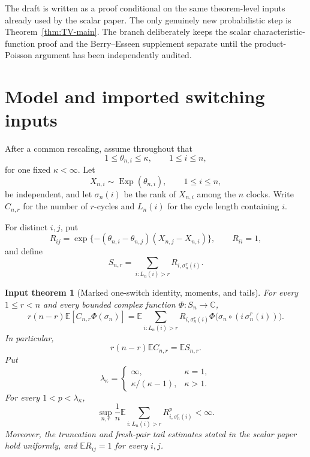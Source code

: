 \documentclass[11pt]{article}
\newtheorem{inputtheorem}[theorem]{Input theorem}
\theoremstyle{definition}
\theoremstyle{remark}
\newcommand{\Ee}{\mathbb E}
\newcommand{\Exp}{\operatorname{Exp}}
\begin{document}
The draft is written as a proof conditional on the same theorem-level inputs
already used by the scalar paper.  The only genuinely new probabilistic step
is Theorem~\ref{thm:TV-main}.  The branch deliberately keeps the scalar
characteristic-function proof and the Berry--Esseen supplement separate until
the product-Poisson argument has been independently audited.

\section{Model and imported switching inputs}

After a common rescaling, assume throughout that
\begin{equation}\label{eq:comparable}
 1\le\theta_{n,i}\le\kappa,
 \qquad 1\le i\le n,
\end{equation}
for one fixed $\kappa<\infty$.  Let
\[
 X_{n,i}\sim\Exp(\theta_{n,i}),
 \qquad 1\le i\le n,
\]
be independent, and let $\sigma_n(i)$ be the rank of $X_{n,i}$ among the
$n$ clocks.  Write $C_{n,r}$ for the number of $r$-cycles and $L_n(i)$ for
the cycle length containing $i$.

For distinct $i,j$, put
\begin{equation}\label{eq:Rij}
 R_{ij}=\exp\{-(\theta_{n,i}-\theta_{n,j})(X_{n,j}-X_{n,i})\},
 \qquad R_{ii}=1,
\end{equation}
and define
\begin{equation}\label{eq:S-n-r}
 S_{n,r}=\sum_{i:L_n(i)>r}R_{i,\sigma_n^r(i)}.
\end{equation}

\begin{inputtheorem}[Marked one-switch identity, moments, and tails]
\label{input:one-switch}
For every $1\le r<n$ and every bounded complex function
$\Phi:S_n\to\mathbb C$,
\begin{equation}\label{eq:marked-switch}
 r(n-r)\Ee[C_{n,r}\Phi(\sigma_n)]
 =\Ee\sum_{i:L_n(i)>r}
 R_{i,\sigma_n^r(i)}
 \Phi\bigl(\sigma_n\circ(i\,\sigma_n^r(i))\bigr).
\end{equation}
In particular,
\begin{equation}\label{eq:mean-switch}
 r(n-r)\Ee C_{n,r}=\Ee S_{n,r}.
\end{equation}
Put
\[
 \lambda_\kappa=
 \begin{cases}
 \infty,&\kappa=1,\\[1mm]
 \kappa/(\kappa-1),&\kappa>1.
 \end{cases}
\]
For every $1<p<\lambda_\kappa$,
\begin{equation}\label{eq:selected-p}
 \sup_{n,r}\frac1n\Ee\sum_{i:L_n(i)>r}
 R_{i,\sigma_n^r(i)}^p<\infty.
\end{equation}
Moreover, the truncation and fresh-pair tail estimates stated in the scalar
paper hold uniformly, and $\Ee R_{ij}=1$ for every $i,j$.
\end{inputtheorem}
\end{document}
